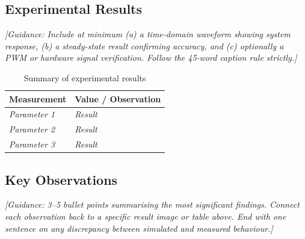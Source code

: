 \subsection{Experimental Results}

%

\textit{[Guidance: Include at minimum (a) a time-domain waveform
showing system response, (b) a steady-state result confirming
accuracy, and (c) optionally a PWM or hardware signal verification.
Follow the 45-word caption rule strictly.]}

\begin{table}[H]
    \centering
    \caption{Summary of experimental results}
    \label{tab:results}
    \begin{tabularx}{\textwidth}{|l|X|}
        \hline
        \textbf{Measurement} & \textbf{Value / Observation} \\
        \hline
        \textit{Parameter 1} & \textit{Result} \\
        \hline
        \textit{Parameter 2} & \textit{Result} \\
        \hline
        \textit{Parameter 3} & \textit{Result} \\
        \hline
    \end{tabularx}
\end{table}

\subsection{Key Observations}

\textit{[Guidance: 3--5 bullet points summarising the most
significant findings. Connect each observation back to a
specific result image or table above. End with one sentence
on any discrepancy between simulated and measured behaviour.]}

